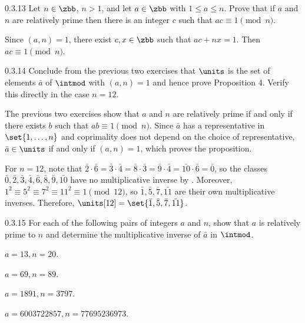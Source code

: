 \begin{exercise}{0.3.13}
    Let $n \in \zbb$, $n > 1$, and let $a \in \zbb$ with $1 \leq a \leq n$.
	Prove that if $a$ and $n$ are relatively prime then there is an integer $c$ such that $ac \equiv 1 \pmod n$.
\end{exercise}

\begin{sol}
    Since $(a, n) = 1$, there exist $c, x \in \zbb$ such that $ac + nx = 1$.
	Then $ac \equiv 1 \pmod n$.
\end{sol}

\begin{exercise}{0.3.14}
    Conclude from the previous two exercises that $\units$ is the set of elements $\bar a$ of $\intmod$ with $(a, n) = 1$ and hence prove Proposition 4.
	Verify this directly in the case $n = 12$.
\end{exercise}

\begin{sol}
    The previous two exercises show that $a$ and $n$ are relatively prime if and only if there exists $b$ such that $ab \equiv 1 \pmod n$.
    Since $\bar a$ has a representative in $\set{1, \ldots, n}$ and coprimality does not depend on the choice of representative, $\bar a \in \units$ if and only if $(a, n) = 1$, which proves the proposition.

	For $n = 12$, note that $\bar 2 \cdot \bar 6 = \bar 3 \cdot \bar 4 = \bar 8 \cdot \bar 3 = \bar 9 \cdot \bar 4 = \bar{10} \cdot \bar 6 = \bar 0$, so the classes $\bar 0, \bar 2, \bar 3, \bar 4, \bar 6, \bar 8, \bar 9, \bar{10}$ have no multiplicative inverse by .
    Moreover, $1^2 \equiv 5^2 \equiv 7^2 \equiv 11^2 \equiv 1 \pmod{12}$, so $\bar 1, \bar 5, \bar 7, \bar{11}$ are their own multiplicative inverses.
    Therefore, $\units[12] = \set{\bar 1, \bar 5, \bar 7, \bar{11}}$.
\end{sol}

\begin{exercise}{0.3.15}
    For each of the following pairs of integers $a$ and $n$, show that $a$ is relatively prime to $n$ and determine the multiplicative inverse of $\bar a$ in $\intmod$.
    \begin{subexercises}
        \item $a = 13, n = 20$.
        \item $a = 69, n = 89$.
        \item $a = 1891, n = 3797$.
        \item $a = 6003722857, n = 77695236973$.
    \end{subexercises}
\end{exercise}


